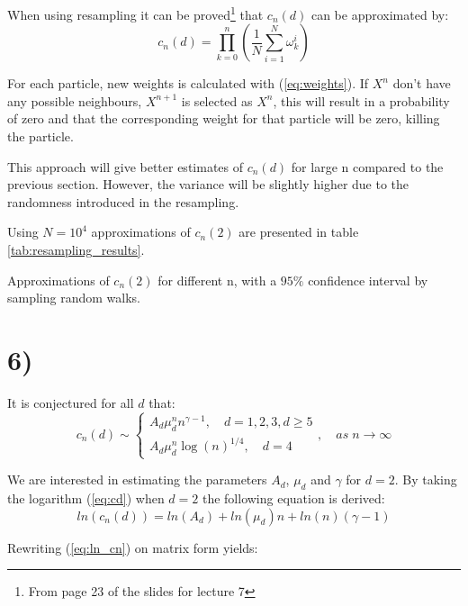\documentclass[a4paper]{article}
\begin{document}
When using resampling it can be proved\footnote{From page 23 of the slides for lecture 7} that $c_n(d)$ can be approximated by:
\begin{equation}
    c_n(d) = \prod_{k = 0}^n(\frac{1}{N}\sum_{i=1}^N\omega_k^i)
\end{equation}

For each particle, new weights is calculated with (\ref{eq:weights}). If $X^{n}$ don't have any possible neighbours, $X^{n+1}$ is selected as $X^n$, this will result in a probability of zero and that the corresponding weight for that particle will be zero, killing the particle.

This approach will give better estimates of $c_n(d)$ for large n compared to the previous section. However, the variance will be slightly higher due to the randomness introduced in the resampling.

Using $N = 10^4$ approximations of $c_n(2)$ are presented in table \ref{tab:resampling_results}.

\begin{table}[H]
    \centering
    \caption{Approximations of $c_n(2)$ for different n, with a $95\%$ confidence interval by sampling random walks.}
    \label{tab:resampling_results}
    
\end{table}

\section*{6)}

It is conjectured for all $d$ that:
\begin{equation}
    \label{eq:cd}
    c_n(d) \sim 
    \begin{cases}
        A_d\mu_d^nn^{\gamma-1}, \quad d = 1, 2, 3, d \geq 5 \\
        A_d\mu_d^n\log(n)^{1/4}, \quad d = 4
    \end{cases}, \quad as \; n \to \infty
\end{equation}

We are interested in estimating the parameters $A_d$, $\mu_d$ and $\gamma$ for $d = 2$.
By taking the logarithm (\ref{eq:cd}) when $d=2$ the following equation is derived:
\begin{equation}
    ln(c_n(d)) =  ln(A_d)+ln(\mu_d)n+ln(n)({\gamma-1})
    \label{eq:ln_cn}
\end{equation}

Rewriting (\ref{eq:ln_cn}) on matrix form yields:
\end{document}
